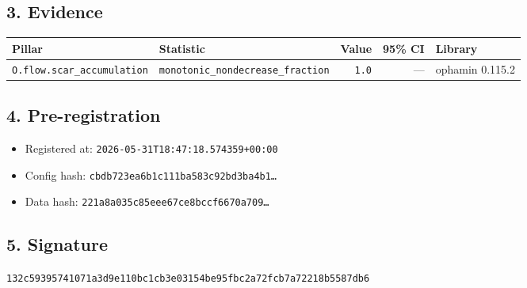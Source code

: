 \documentclass{article}
\begin{document}
\subsection*{3. Evidence}
\begin{tabular}{llrrl}\toprule
\textbf{Pillar} & \textbf{Statistic} & \textbf{Value} & \textbf{95\% CI} & \textbf{Library} \\\midrule
\texttt{O.flow.scar\_accumulation} & \texttt{monotonic\_nondecrease\_fraction} & \texttt{1.0} & --- & ophamin 0.115.2 \\
\bottomrule\end{tabular}
\subsection*{4. Pre-registration}
\begin{itemize}
\item Registered at: \texttt{2026-05-31T18:47:18.574359+00:00}
\item Config hash: \texttt{cbdb723ea6b1c111ba583c92bd3ba4b1\dots}
\item Data hash: \texttt{221a8a035c85eee67ce8bccf6670a709\dots}
\end{itemize}
\subsection*{5. Signature}
\texttt{132c59395741071a3d9e110bc1cb3e03154be95fbc2a72fcb7a72218b5587db6}\\
\end{document}
